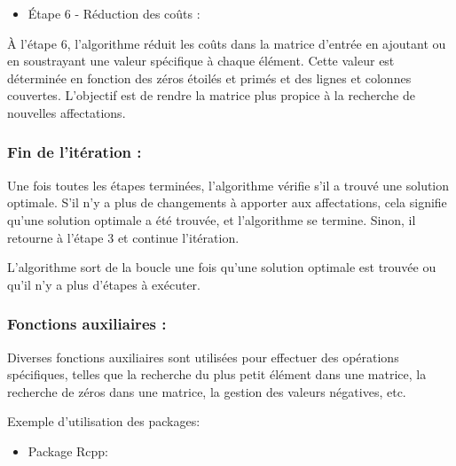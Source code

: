 \documentclass[
]{article}
\providecommand{\tightlist}{%
  \setlength{\itemsep}{0pt}\setlength{\parskip}{0pt}}
\begin{document}
\begin{itemize}
\tightlist
\item
  Étape 6 - Réduction des coûts :
\end{itemize}

À l'étape 6, l'algorithme réduit les coûts dans la matrice d'entrée en
ajoutant ou en soustrayant une valeur spécifique à chaque élément. Cette
valeur est déterminée en fonction des zéros étoilés et primés et des
lignes et colonnes couvertes. L'objectif est de rendre la matrice plus
propice à la recherche de nouvelles affectations.

\hypertarget{fin-de-lituxe9ration}{%
\subsubsection{Fin de l'itération :}\label{fin-de-lituxe9ration}}

Une fois toutes les étapes terminées, l'algorithme vérifie s'il a trouvé
une solution optimale. S'il n'y a plus de changements à apporter aux
affectations, cela signifie qu'une solution optimale a été trouvée, et
l'algorithme se termine. Sinon, il retourne à l'étape 3 et continue
l'itération.

L'algorithme sort de la boucle une fois qu'une solution optimale est
trouvée ou qu'il n'y a plus d'étapes à exécuter.

\hypertarget{fonctions-auxiliaires}{%
\subsubsection{Fonctions auxiliaires :}\label{fonctions-auxiliaires}}

Diverses fonctions auxiliaires sont utilisées pour effectuer des
opérations spécifiques, telles que la recherche du plus petit élément
dans une matrice, la recherche de zéros dans une matrice, la gestion des
valeurs négatives, etc.

Exemple d'utilisation des packages:

\begin{itemize}
\tightlist
\item
  Package Rcpp:
\end{itemize}
\end{document}
